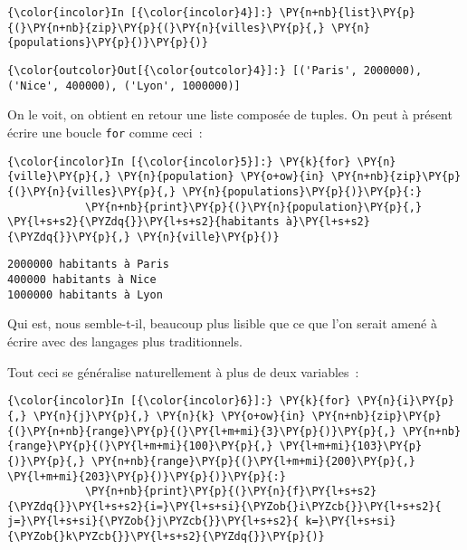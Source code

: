     \begin{Verbatim}[commandchars=\\\{\},frame=single,framerule=0.3mm,rulecolor=\color{cellframecolor}]
{\color{incolor}In [{\color{incolor}4}]:} \PY{n+nb}{list}\PY{p}{(}\PY{n+nb}{zip}\PY{p}{(}\PY{n}{villes}\PY{p}{,} \PY{n}{populations}\PY{p}{)}\PY{p}{)}
\end{Verbatim}


\begin{Verbatim}[commandchars=\\\{\},frame=single,framerule=0.3mm,rulecolor=\color{cellframecolor}]
{\color{outcolor}Out[{\color{outcolor}4}]:} [('Paris', 2000000), ('Nice', 400000), ('Lyon', 1000000)]
\end{Verbatim}
            
    On le voit, on obtient en retour une liste composée de tuples. On peut à
présent écrire une boucle \texttt{for} comme ceci~:

    \begin{Verbatim}[commandchars=\\\{\},frame=single,framerule=0.3mm,rulecolor=\color{cellframecolor}]
{\color{incolor}In [{\color{incolor}5}]:} \PY{k}{for} \PY{n}{ville}\PY{p}{,} \PY{n}{population} \PY{o+ow}{in} \PY{n+nb}{zip}\PY{p}{(}\PY{n}{villes}\PY{p}{,} \PY{n}{populations}\PY{p}{)}\PY{p}{:}
            \PY{n+nb}{print}\PY{p}{(}\PY{n}{population}\PY{p}{,} \PY{l+s+s2}{\PYZdq{}}\PY{l+s+s2}{habitants à}\PY{l+s+s2}{\PYZdq{}}\PY{p}{,} \PY{n}{ville}\PY{p}{)}
\end{Verbatim}


    \begin{Verbatim}[commandchars=\\\{\},frame=single,framerule=0.3mm,rulecolor=\color{cellframecolor}]
2000000 habitants à Paris
400000 habitants à Nice
1000000 habitants à Lyon
\end{Verbatim}

    Qui est, nous semble-t-il, beaucoup plus lisible que ce que l'on serait
amené à écrire avec des langages plus traditionnels.

Tout ceci se généralise naturellement à plus de deux variables~:

    \begin{Verbatim}[commandchars=\\\{\},frame=single,framerule=0.3mm,rulecolor=\color{cellframecolor}]
{\color{incolor}In [{\color{incolor}6}]:} \PY{k}{for} \PY{n}{i}\PY{p}{,} \PY{n}{j}\PY{p}{,} \PY{n}{k} \PY{o+ow}{in} \PY{n+nb}{zip}\PY{p}{(}\PY{n+nb}{range}\PY{p}{(}\PY{l+m+mi}{3}\PY{p}{)}\PY{p}{,} \PY{n+nb}{range}\PY{p}{(}\PY{l+m+mi}{100}\PY{p}{,} \PY{l+m+mi}{103}\PY{p}{)}\PY{p}{,} \PY{n+nb}{range}\PY{p}{(}\PY{l+m+mi}{200}\PY{p}{,} \PY{l+m+mi}{203}\PY{p}{)}\PY{p}{)}\PY{p}{:}
            \PY{n+nb}{print}\PY{p}{(}\PY{n}{f}\PY{l+s+s2}{\PYZdq{}}\PY{l+s+s2}{i=}\PY{l+s+si}{\PYZob{}i\PYZcb{}}\PY{l+s+s2}{ j=}\PY{l+s+si}{\PYZob{}j\PYZcb{}}\PY{l+s+s2}{ k=}\PY{l+s+si}{\PYZob{}k\PYZcb{}}\PY{l+s+s2}{\PYZdq{}}\PY{p}{)}
\end{Verbatim}


